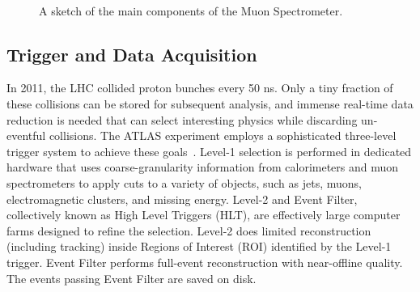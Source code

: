 \begin{figure}[phtb]
  \begin{center}
          \\
 \caption{ A sketch of the main components of the Muon Spectrometer. }
 \label{fig:det:muons}
 \end{center}
\end{figure}

\subsection{ Trigger and Data Acquisition }
\label{sec:det:trigger}
In 2011, the LHC collided proton bunches every 50 ns. Only a tiny fraction of these collisions can be stored for subsequent analysis, and immense real-time data reduction is needed that can select interesting physics while discarding un-eventful collisions. The ATLAS experiment employs a sophisticated three-level trigger system to achieve these goals~\cite{Jenni:616089}. Level-1 selection is performed in dedicated hardware that uses coarse-granularity information from calorimeters and muon spectrometers to apply cuts to a variety of objects, such as jets, muons, electromagnetic clusters, and missing energy. Level-2 and Event Filter, collectively known as High Level Triggers (HLT), are effectively large computer farms designed to refine the selection. Level-2 does limited reconstruction (including tracking) inside Regions of Interest (ROI) identified by the Level-1 trigger. Event Filter performs full-event reconstruction with near-offline quality. The events passing Event Filter are saved on disk.

